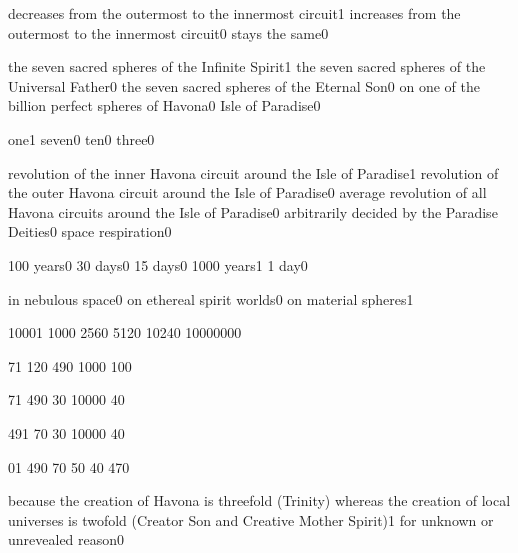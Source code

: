 {decreases from the outermost to the innermost circuit}{1}
{increases from the outermost to the innermost circuit}{0}
{stays the same}{0}
\qstop

{the seven sacred spheres of the Infinite Spirit}{1}
{the seven sacred spheres of the Universal Father}{0}
{the seven sacred spheres of the Eternal Son}{0}
{on one of the billion perfect spheres of Havona}{0}
{Isle of Paradise}{0}
\qstop

{one}{1}
{seven}{0}
{ten}{0}
{three}{0}
\qstop

{revolution of the inner Havona circuit around the Isle of Paradise}{1}
{revolution of the outer Havona circuit around the Isle of Paradise}{0}
{average revolution of all Havona circuits around the Isle of Paradise}{0}
{arbitrarily decided by the Paradise Deities}{0}
{space respiration}{0}
\qstop


{100 years}{0}
{30 days}{0}
{15 days}{0}
{1000 years}{1}
{1 day}{0}
\qstop

{in nebulous space}{0}
{on ethereal spirit worlds}{0}
{on material spheres}{1}
\qstop

{1000}{1}
{100}{0}
{256}{0}
{512}{0}
{1024}{0}
{1000000}{0}
\qstop

{7}{1}
{12}{0}
{49}{0}
{100}{0}
{10}{0}
\qstop

{7}{1}
{49}{0}
{3}{0}
{1000}{0}
{4}{0}
\qstop

{49}{1}
{7}{0}
{3}{0}
{1000}{0}
{4}{0}
\qstop

{0}{1}
{49}{0}
{7}{0}
{5}{0}
{4}{0}
{47}{0}
\qstop

{because the creation of Havona is threefold (Trinity) whereas the creation of local universes is twofold (Creator Son and Creative Mother Spirit)}{1}
{for unknown or unrevealed reason}{0}
\qstop


